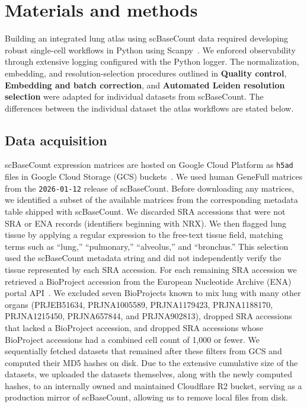 \documentclass[10pt,letterpaper]{article}
\begin{document}

\section*{Materials and methods}
Building an integrated lung atlas using scBaseCount data required developing robust single-cell workflows in Python using Scanpy~\parencite{wolfSCANPYLargescaleSinglecell2018}. We enforced observability through extensive logging configured with the Python logger. The normalization, embedding, and resolution-selection procedures outlined in \textbf{Quality control}, \textbf{Embedding and batch correction}, and \textbf{Automated Leiden resolution selection} were adapted for individual datasets from scBaseCount. The differences between the individual dataset the atlas workflows are stated below.
\subsection*{Data acquisition}
scBaseCount expression matrices are hosted on Google Cloud Platform as \texttt{h5ad} files in Google Cloud Storage (GCS) buckets~\parencite{youngblutScBaseCountAIAgentcurated2025}. We used human GeneFull matrices from the \texttt{2026-01-12} release of scBaseCount. Before downloading any matrices, we identified a subset of the available matrices from the corresponding metadata table shipped with scBaseCount. We discarded SRA accessions that were not SRA or ENA records (identifiers beginning with NRX). We then flagged lung tissue by applying a regular expression to the free-text tissue field, matching terms such as ``lung,'' ``pulmonary,'' ``alveolus,'' and ``bronchus.'' This selection used the scBaseCount metadata string and did not independently verify the tissue represented by each SRA accession. For each remaining SRA accession we retrieved a BioProject accession from the European Nucleotide Archive (ENA) portal API~\parencite{amidEuropeanNucleotideArchive2020}. We excluded seven BioProjects known to mix lung with many other organs (PRJEB51634, PRJNA1005589, PRJNA1179423, PRJNA1188170, PRJNA1215450, PRJNA657844, and PRJNA902813), dropped SRA accessions that lacked a BioProject accession, and dropped SRA accessions whose BioProject accessions had a combined cell count of 1,000 or fewer. We sequentially fetched datasets that remained after these filters from GCS and computed their MD5 hashes on disk. Due to the extensive cumulative size of the datasets, we uploaded the datasets themselves, along with the newly computed hashes, to an internally owned and maintained Cloudflare R2 bucket, serving as a production mirror of scBaseCount, allowing us to remove local files from disk.
\end{document}
